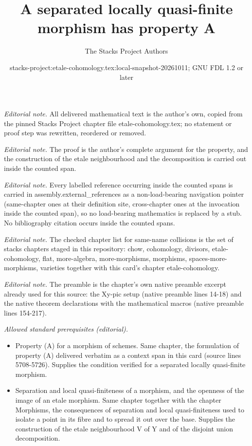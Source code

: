 \documentclass[10pt,a4paper]{amsart}
\title{A separated locally quasi-finite morphism has property A}
\author{The Stacks Project Authors}
\date{stacks-project:etale-cohomology.tex:local-snapshot-20261011; GNU FDL 1.2 or later}
\theoremstyle{plain}
\theoremstyle{definition}
\theoremstyle{remark}
\numberwithin{equation}{subsection}
\begin{document}
\maketitle
\noindent\textit{Editorial note.} All delivered mathematical text is the author's own, copied from the pinned Stacks Project chapter file etale-cohomology.tex; no statement or proof step was rewritten, reordered or removed.\par\medskip
\noindent\textit{Editorial note.} The proof is the author's complete argument for the property, and the construction of the etale neighbourhood and the decomposition is carried out inside the counted span.\par\medskip
\noindent\textit{Editorial note.} Every labelled reference occurring inside the counted spans is carried in assembly.external\_references as a non-load-bearing navigation pointer (same-chapter ones at their definition site, cross-chapter ones at the invocation inside the counted span), so no load-bearing mathematics is replaced by a stub. No bibliography citation occurs inside the counted spans.\par\medskip
\noindent\textit{Editorial note.} The checked chapter list for same-name collisions is the set of stacks chapters staged in this repository: chow, cohomology, divisors, etale-cohomology, flat, more-algebra, more-morphisms, morphisms, spaces-more-morphisms, varieties together with this card's chapter etale-cohomology.\par\medskip
\noindent\textit{Editorial note.} The preamble is the chapter's own native preamble excerpt already used for this source: the Xy-pic setup (native preamble lines 14-18) and the native theorem declarations with the mathematical macros (native preamble lines 154-217).\par\medskip
\noindent\textit{Allowed standard prerequisites (editorial).}\begin{itemize}
\item Property (A) for a morphism of schemes. Same chapter, the formulation of property (A) delivered verbatim as a context span in this card (source lines 5708-5726). Supplies the condition verified for a separated locally quasi-finite morphism.
\item Separation and local quasi-finiteness of a morphism, and the openness of the image of an etale morphism. Same chapter together with the chapter Morphisms, the consequences of separation and local quasi-finiteness used to isolate a point in its fibre and to spread it out over the base. Supplies the construction of the etale neighbourhood V of Y and of the disjoint union decomposition.
\end{itemize}\medskip
\end{document}
